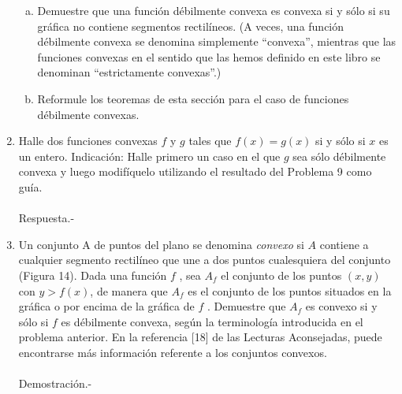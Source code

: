 \begin{enumerate}[\bfseries 1.]
\begin{enumerate}[(a)]
	    \item Demuestre que una función débilmente convexa es convexa si y sólo si su gráfica no contiene segmentos rectilíneos. (A veces, una función débilmente convexa se denomina simplemente “convexa”, mientras que las funciones convexas en el sentido que las hemos definido en este libro se denominan “estrictamente convexas”.)

	    \item Reformule los teoremas de esta sección para el caso de funciones débilmente convexas.

	\end{enumerate}

    \item Halle dos funciones convexas $f$ y $g$ tales que $f(x) = g(x)$ si y sólo si $x$ es un entero. Indicación: Halle primero un caso en el que $g$ sea sólo débilmente convexa y luego modifíquelo utilizando el resultado del Problema 9 como guía.\\\\
	Respuesta.-\; 

    \item Un conjunto A de puntos del plano se denomina \textit{convexo} si $A$ contiene a cualquier segmento rectilíneo que une a dos puntos cualesquiera del conjunto (Figura 14). Dada una función $f$ , sea $A_f$ el conjunto de los puntos $(x,y)$ con $y> f(x)$, de manera que $A_f$ es el conjunto de los puntos situados en la gráfica o por encima de la gráfica de $f$ . Demuestre que $A_f$ es convexo si y sólo si $f$ es débilmente convexa, según la terminología introducida en el problema anterior. En la referencia [18] de las Lecturas Aconsejadas, puede encontrarse más información referente a los conjuntos convexos.\\\\
	Demostración.-\; 

\end{enumerate}
